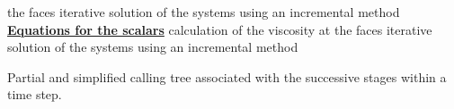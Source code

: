 \begin{table}[htp]
the faces\newline
\hspace*{1,5cm} \hspace*{1cm}iterative solution of the systems
using an incremental method\newline
\underline{\textbf{Equations for the scalars}}\newline
\hspace*{1cm}\newline
\hspace*{1,5cm} \hspace*{1cm}calculation of the viscosity at
the faces\newline
\hspace*{1,5cm} \hspace*{1cm}iterative solution of the systems
using an incremental method\newline
\caption{Partial and simplified calling tree associated with the successive
stages within a time step.}
\label{Base_Introd_simple_calling_tree}
\end{table}
